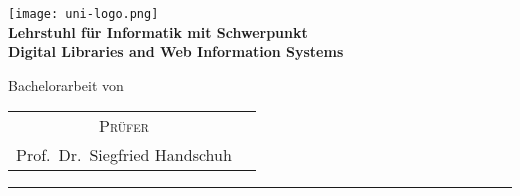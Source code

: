 \begin{titlepage}
    \centering
    \begin{onehalfspace}
    	\begin{german}
        	\texttt{[image: uni-logo.png]}\\
        	\vspace{1.0cm}
        	\large {\bfseries Lehrstuhl für Informatik mit Schwerpunkt\\ \textenglish{Digital Libraries and Web Information Systems}} \\

        	\vspace{2.5cm}

            \begin{doublespace}
            	\textenglish{\textsf{\Huge{\thetitle}}}
            \end{doublespace}

        	\vspace{2cm}

            \Large{Bachelorarbeit von}\\

        	\vspace{1cm}

        	{\bfseries \large{\theauthor}}

        	\vfill

        	{\large
        		\begin{tabular}[l]{cc}
        			\textsc{Prüfer}\\
        			Prof.~Dr.~Siegfried Handschuh
        		\end{tabular}
        	}

        	\vspace{1.5cm}

        	\parbox{\linewidth}{\hrule\strut}

            \vfill

	    \textgerman{\thedate}
    	\end{german}
    \end{onehalfspace}
\end{titlepage}
